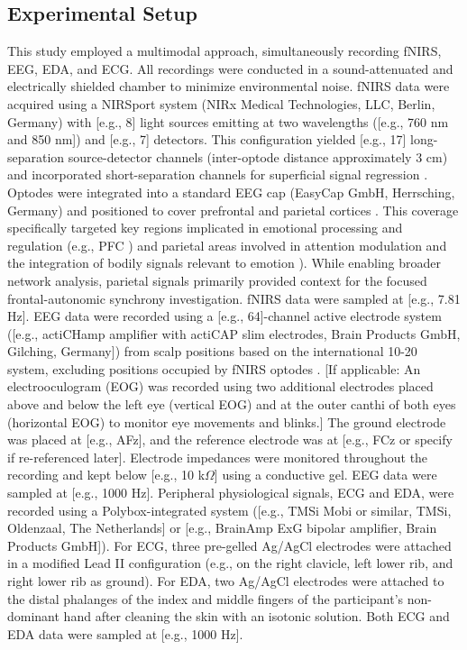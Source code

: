\subsection{Experimental Setup}
This study employed a multimodal approach, simultaneously recording \gls{fNIRS}, \gls{EEG}, \gls{EDA}, and \gls{ECG}. All recordings were conducted in a sound-attenuated and electrically shielded chamber to minimize environmental noise.
\gls{fNIRS} data were acquired using a NIRSport system (NIRx Medical Technologies, LLC, Berlin, Germany) with [e.g., 8] light sources emitting at two wavelengths ([e.g., 760 nm and 850 nm]) and [e.g., 7] detectors. This configuration yielded [e.g., 17] long-separation source-detector channels (inter-optode distance approximately 3 cm) and incorporated short-separation channels for superficial signal regression \parencite{gagnonShortSeparationChannel2012}. Optodes were integrated into a standard \gls{EEG} cap (EasyCap GmbH, Herrsching, Germany) and positioned to cover prefrontal and parietal cortices \parencite{chenStrategicIntegrationCrossDisciplinary2024}. This coverage specifically targeted key regions implicated in emotional processing and regulation (e.g., \gls{PFC} \parencite{fusterPrefrontalCortex2008, etkinEmotionalProcessingAnterior2011}) and parietal areas involved in attention modulation and the integration of bodily signals relevant to emotion \parencite{pessoaRelationshipEmotionCognition2008, critchleyNeuralMechanismsAutonomic2005, culhamHumanParietalCortex2006}). While enabling broader network analysis, parietal signals primarily provided context for the focused frontal-autonomic synchrony investigation. \gls{fNIRS} data were sampled at [e.g., 7.81 Hz].
\gls{EEG} data were recorded using a [e.g., 64]-channel active electrode system ([e.g., actiCHamp amplifier with actiCAP slim electrodes, Brain Products GmbH, Gilching, Germany]) from scalp positions based on the international 10-20 system, excluding positions occupied by \gls{fNIRS} optodes \parencite{sharmaEmergingTrendsEEG2024}. [If applicable: An electrooculogram (EOG) was recorded using two additional electrodes placed above and below the left eye (vertical EOG) and at the outer canthi of both eyes (horizontal EOG) to monitor eye movements and blinks.] The ground electrode was placed at [e.g., AFz], and the reference electrode was at [e.g., FCz or specify if re-referenced later]. Electrode impedances were monitored throughout the recording and kept below [e.g., 10 k$\Omega$] using a conductive gel. \gls{EEG} data were sampled at [e.g., 1000 Hz].
Peripheral physiological signals, \gls{ECG} and \gls{EDA}, were recorded using a Polybox-integrated system ([e.g., TMSi Mobi or similar, TMSi, Oldenzaal, The Netherlands] or [e.g., BrainAmp ExG bipolar amplifier, Brain Products GmbH]). For \gls{ECG}, three pre-gelled Ag/AgCl electrodes were attached in a modified Lead II configuration (e.g., on the right clavicle, left lower rib, and right lower rib as ground). For \gls{EDA}, two Ag/AgCl electrodes were attached to the distal phalanges of the index and middle fingers of the participant's non-dominant hand after cleaning the skin with an isotonic solution. Both \gls{ECG} and \gls{EDA} data were sampled at [e.g., 1000 Hz].

